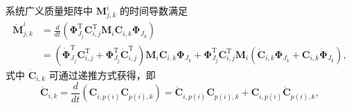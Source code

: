 系统广义质量矩阵中 $\boldsymbol{M}_{j,k}^{i}$ 的时间导数满足
\begin{equation}\label{eq:11.6}
\begin{aligned}
\dot{\boldsymbol{M}}_{j,k}^{i} &= \frac{d}{dt} \left( \boldsymbol{\Phi}_{J_j}^{\mathrm{T}} \boldsymbol{C}_{i,j}^{\mathrm{T}} \boldsymbol{M}_i \boldsymbol{C}_{i,k} \boldsymbol{\Phi}_{J_k} \right) \\
&= \left( \dot{\boldsymbol{\Phi}}_{J_j}^{\mathrm{T}} \boldsymbol{C}_{i,j}^{\mathrm{T}} + \boldsymbol{\Phi}_{J_j}^{\mathrm{T}} \dot{\boldsymbol{C}}_{i,j}^{\mathrm{T}} \right) \boldsymbol{M}_i \boldsymbol{C}_{i,k} \boldsymbol{\Phi}_{J_k}
   + \boldsymbol{\Phi}_{J_j}^{\mathrm{T}} \boldsymbol{C}_{i,j}^{\mathrm{T}} \boldsymbol{M}_i \left( \dot{\boldsymbol{C}}_{i,k} \boldsymbol{\Phi}_{J_k} + \boldsymbol{C}_{i,k} \dot{\boldsymbol{\Phi}}_{J_k} \right),
\end{aligned}
\end{equation}
式中 $\dot{\boldsymbol{C}}_{i,k}$ 可通过递推方式获得，即
\begin{equation}\label{eq:11.7}
\dot{\boldsymbol{C}}_{i,k} = \frac{d}{dt} \left( \boldsymbol{C}_{i,p(i)} \boldsymbol{C}_{p(i),k} \right) = \dot{\boldsymbol{C}}_{i,p(i)} \boldsymbol{C}_{p(i),k} + \boldsymbol{C}_{i,p(i)} \dot{\boldsymbol{C}}_{p(i),k},
\end{equation}

